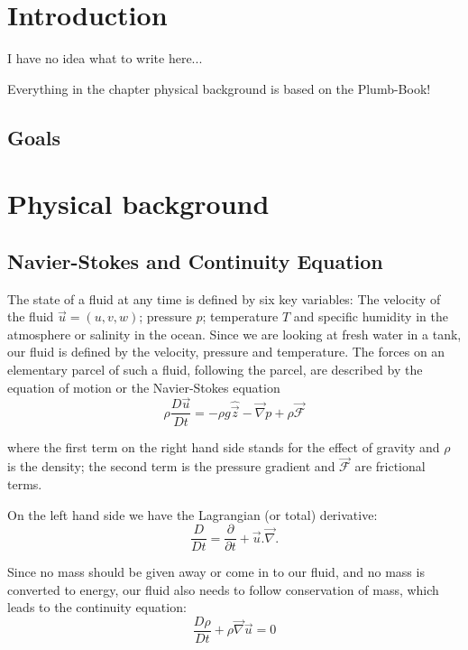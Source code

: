 \documentclass[12pt, a4paper, twoside]{article}
\begin{document}
\section{Introduction}
	I have no idea what to write here...
	
	Everything in the chapter physical background is based on the Plumb-Book!
	
	\subsection{Goals}
		

\newpage

\section{Physical background}

	\subsection{Navier-Stokes and Continuity Equation}
		
		The state of a fluid at any time is defined by six key variables:
		The velocity of the fluid $\vec{u}=(u,v,w)$; pressure $p$; temperature $T$ and specific humidity in the atmosphere or salinity in the ocean. Since we are looking at fresh water in a tank, our fluid is defined by the velocity, pressure and temperature. The forces on an elementary parcel of such a fluid, following the parcel, are described by the equation of motion	or the Navier-Stokes equation
		\begin{equation}
			\rho \frac{D\vec{u}}{Dt} = -\rho g \hat{\vec{z}} - \vec{\nabla} p + \rho \vec{\mathcal{F}}
			\label{eq:Simple NSG}
		\end{equation} 
		
		where the first term on the right hand side stands for the effect of gravity and $\rho$ is the density; the second term is the pressure gradient and $\vec{\mathcal{F}}$ are frictional terms.
		
		On the left hand side we have the Lagrangian (or total) derivative:
		\begin{equation}
			\frac{D}{Dt} = \frac{\partial}{\partial t} + \vec{u}.\vec{\nabla}.
			\label{eq:Lag Dev}
		\end{equation} 
		
		
		Since no mass should be given away or come in to our fluid, and no mass is converted to energy, our fluid also needs to follow conservation of mass, which leads to the continuity equation:
		\begin{equation}
			\frac{D\rho}{Dt} + \rho \vec{\nabla} \vec{u} = 0
			\label{eq:Continuity}
		\end{equation}
		
\end{document}
